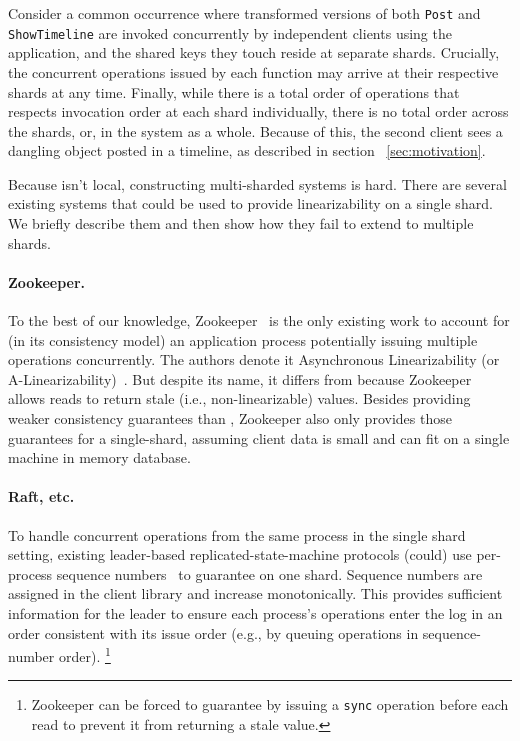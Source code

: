 Consider a common occurrence where \IOCL{} transformed versions of both \texttt{Post} and \texttt{ShowTimeline} are invoked concurrently by independent clients using the application, and the shared keys they touch reside at separate shards. Crucially, the concurrent operations issued by each function may arrive at their respective shards at any time. Finally, while there is a total order of operations that respects invocation order at each shard individually, there is no total order across the shards, or, in the system as a whole. Because of this, the second client sees a dangling object posted in a timeline, as described in section ~\ref{sec:motivation}.





Because \IOCL isn't local, constructing multi-sharded \iocll{} systems is hard.
There are several existing systems that could be used to provide
\multidispatch{} linearizability on a single shard. We briefly describe them and then show how they fail to extend to multiple shards.

\paragraph{Zookeeper.} To the best of our knowledge, Zookeeper~\cite{hunt2010zookeeper} is the
only existing work to account for (in its consistency model) an 
application process potentially issuing multiple operations concurrently. The authors denote it Asynchronous Linearizability
(or A-Linearizability)~\cite{hunt2010zookeeper}. But despite its name,
it differs from \MDL{} because Zookeeper allows
reads to return stale (i.e., non-linearizable) values. Besides providing weaker consistency guarantees than \mdl{}, Zookeeper also only provides those guarantees for a single-shard, assuming client data is small and can fit on a single machine in memory database.

\paragraph{Raft, etc.} To handle concurrent operations from the same process in the single shard setting, existing leader-based replicated-state-machine protocols (could) use
per-process sequence numbers~\cite{ongaro2014raft,lamport1998paxos,oki1988vr} to guarantee \MDL{} on one shard. Sequence numbers are assigned in the client 
library and increase monotonically. This provides sufficient information for
the leader to ensure each process's operations enter the log in an
order consistent with its issue order
(e.g., by queuing operations in sequence-number order).
\footnote{Zookeeper can be forced to
guarantee \MDL{} by issuing a \texttt{sync} operation before each read to prevent it from returning a stale value.}


